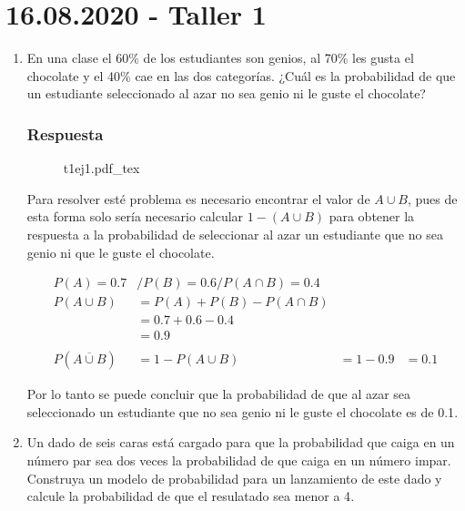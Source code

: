 \documentclass[dvipsnames,a4paper]{book}
\newcommand{\incfig}[2][1]{%
    \def\svgwidth{#1\columnwidth}
    {#2.pdf_tex}
}
\begin{document}
\section{16.08.2020 - Taller 1}
\label{sec:taller_1}

\begin{enumerate}[{Ej1. }]
\item En una clase el {\color{teal} 60\% de los estudiantes son genios}, al
    {\color{brown} 70\% les gusta} el chocolate y el {\color{orange} 40\%
    cae en las dos categorías}. ¿Cuál es la probabilidad de que un
    estudiante seleccionado al azar no sea genio ni le guste el chocolate?

\subsubsection{Respuesta}

\begin{figure}[ht]
    \centering
    \incfig[0.4]{t1ej1}
\end{figure}
Para resolver esté problema es necesario encontrar el valor de \(A\cup B\),
pues de esta forma solo sería necesario calcular \(1-\left(A\cup B\right)\)
para obtener la respuesta a la probabilidad de seleccionar al azar un
estudiante que no sea genio ni que le guste el chocolate.

\begin{align*}
    P\left(A\right)= 0.7&/P\left(B\right)=0.6/P\left(A\cap B\right)=0.4\\
    P\left(A\cup B\right) &= P\left(A\right)+P\left(B\right)-P\left(A\cap B\right)\\
    &=0.7+0.6-0.4\\
    &=0.9\\
    \\
    P\left(\overline{A\cup B}\right) &= 1-P\left(A\cup B\right)
    &= 1-0.9
    &=0.1
\end{align*}

Por lo tanto se puede concluir que la probabilidad de que al azar sea seleccionado un estudiante que no sea genio ni le guste el chocolate es de {\color{orange} 0.1}.

\item  Un dado de seis caras está cargado para que la probabilidad que caiga
    {\color{OrangeRed} en un número par sea dos veces la probabilidad de que
    caiga en un número impar}. {\color{olive} Construya un modelo de
    probabilidad para un lanzamiento de este dado y calcule la probabilidad de
    que el resulatado sea menor a 4}.


\end{enumerate}
\end{document}
